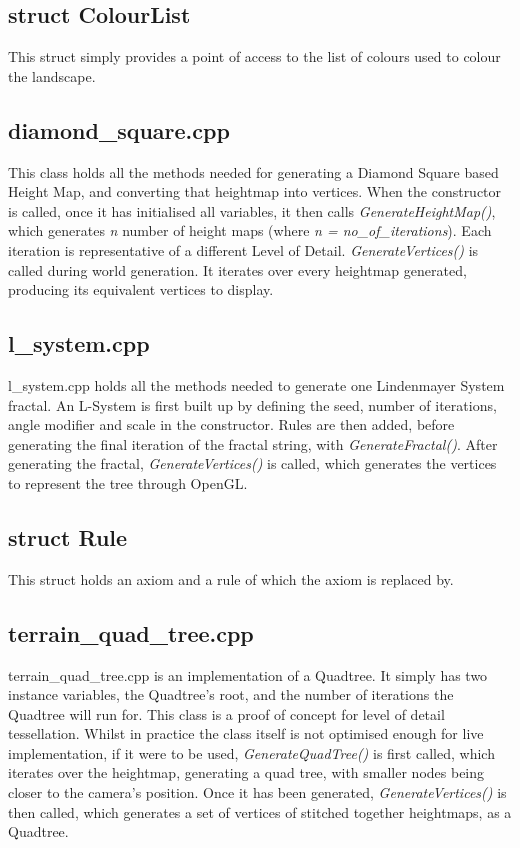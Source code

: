 \documentclass[a4paper,10pt]{report}
\begin{document}
\subsection{struct ColourList}
This struct simply provides a point of access to the list of colours used to colour the landscape.

\subsection{diamond\_square.cpp}

This class holds all the methods needed for generating a Diamond Square based Height Map, and converting that heightmap into vertices. When the constructor is called, once it has initialised all variables, it then calls \textit{GenerateHeightMap()}, which generates \textit{n} number of height maps (where \textit{n = no\_of\_iterations}). Each iteration is representative of a different Level of Detail. \textit{GenerateVertices()} is called during world generation. It iterates over every heightmap generated, producing its equivalent vertices to display. 

\subsection{l\_system.cpp}
l\_system.cpp holds all the methods needed to generate one Lindenmayer System fractal. An L-System is first built up by defining the seed, number of iterations, angle modifier and scale in the constructor. Rules are then added, before generating the final iteration of the fractal string, with \textit{GenerateFractal()}. After generating the fractal, \textit{GenerateVertices()} is called, which generates the vertices to represent the tree through OpenGL.

\subsection{struct Rule}
This struct holds an axiom and a rule of which the axiom is replaced by. 

\subsection{terrain\_quad\_tree.cpp}
terrain\_quad\_tree.cpp is an implementation of a Quadtree. It simply has two instance variables, the Quadtree's root, and the number of iterations the Quadtree will run for. This class is a proof of concept for level of detail tessellation. Whilst in practice the class itself is not optimised enough for live implementation, if it were to be used, \textit{GenerateQuadTree()} is first called, which iterates over the heightmap, generating a quad tree, with smaller nodes being closer to the camera's position. Once it has been generated, \textit{GenerateVertices()} is then called, which generates a set of vertices of stitched together heightmaps, as a Quadtree. 
\end{document}
